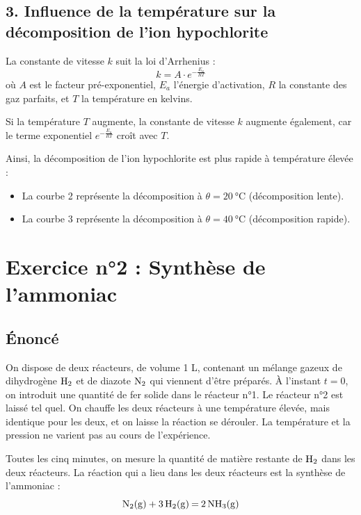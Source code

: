 \documentclass[12pt,a4paper]{article}
\newenvironment{correctionenv}
{
    \par\noindent
    \begin{minipage}{\linewidth}
    \color{correction}
}
{
    \end{minipage}
    \par\vspace{2mm}
}
\begin{document}
\subsection*{3. Influence de la température sur la décomposition de l’ion hypochlorite}

\begin{correctionenv}
    La constante de vitesse $k$ suit la loi d'Arrhenius :
    $$
    k = A \cdot e^{-\frac{E_a}{RT}}
    $$
    où $A$ est le facteur pré-exponentiel, $E_a$ l'énergie d'activation, $R$ la constante des gaz parfaits, et $T$ la température en kelvins.

    Si la température $T$ augmente, la constante de vitesse $k$ augmente également, car le terme exponentiel $e^{-\frac{E_a}{RT}}$ croît avec $T$.

    Ainsi, la décomposition de l'ion hypochlorite est plus rapide à température élevée :
    \begin{itemize}
        \item La courbe 2 représente la décomposition à $\theta = \SI{20}{\celsius}$ (décomposition lente).
        \item La courbe 3 représente la décomposition à $\theta = \SI{40}{\celsius}$ (décomposition rapide).
    \end{itemize}
\end{correctionenv}

\section*{Exercice n°2 : Synthèse de l'ammoniac}

\subsection*{Énoncé}
On dispose de deux réacteurs, de volume 1 L, contenant un mélange gazeux de dihydrogène $\ce{H2}$ et de diazote $\ce{N2}$ qui viennent d'être préparés. À l'instant $t = 0$, on introduit une quantité de fer solide dans le réacteur n°1. Le réacteur n°2 est laissé tel quel. On chauffe les deux réacteurs à une température élevée, mais identique pour les deux, et on laisse la réaction se dérouler. La température et la pression ne varient pas au cours de l'expérience.

Toutes les cinq minutes, on mesure la quantité de matière restante de $\ce{H2}$ dans les deux réacteurs. La réaction qui a lieu dans les deux réacteurs est la synthèse de l'ammoniac :
\[
\ce{N2(g) + 3 H2(g) = 2 NH3(g)}
\]
\end{document}
